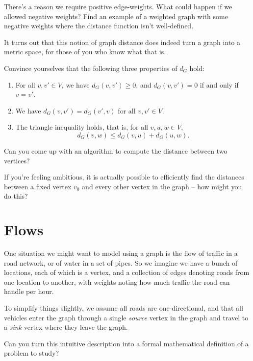 \documentclass[nobib]{tufte-handout}
\begin{document}
\begin{xca}
  There's a reason we require positive edge-weights. What could happen if we allowed negative weights? Find an example of a weighted graph with some negative weights where the distance function isn't well-defined.
\end{xca}

It turns out that this notion of graph distance does indeed turn a graph into a metric space, for those of you who know what that is.

\begin{xca}
  Convince yourselves that the following three properties of $d_G$ hold:
  \begin{enumerate}
    \item For all $v, v' \in V$, we have $d_G(v, v') \geq 0$, and $d_G(v,v') = 0$ if and only if $v = v'$.
    \item We have $d_G(v,v') = d_G(v',v)$ for all $v, v' \in V$.
    \item The triangle inequality holds, that is, for all $v, u, w \in V$,
    $$d_G(v, w) \leq d_G(v, u) + d_G(u, w).$$
  \end{enumerate}
\end{xca}

\begin{xca}
  Can you come up with an algorithm to compute the distance between two vertices?

  If you're feeling ambitious, it is actually possible to efficiently find the distances between a fixed vertex $v_0$ and every other vertex in the graph -- how might you do this?
\end{xca}

\section{Flows}

One situation we might want to model using a graph is the flow of traffic in a road network, or of water in a set of pipes. So we imagine we have a bunch of locations, each of which is a vertex, and a collection of edges denoting roads from one location to another, with weights noting how much traffic the road can handle per hour.

To simplify things slightly, we assume all roads are one-directional, and that all vehicles enter the graph through a single \emph{source} vertex in the graph and travel to a \emph{sink} vertex where they leave the graph. 

\begin{xca}
  Can you turn this intuitive description into a formal mathematical definition of a problem to study?
\end{xca}
\end{document}

